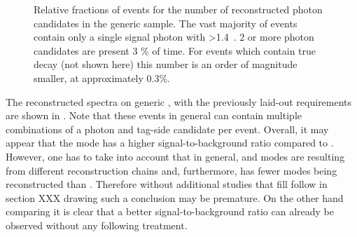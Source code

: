 \begin{figure}[htbp!]
    \centering
    \caption{\label{fig:photon_reco_candidates} Relative fractions of events for the number of reconstructed photon candidates in the generic \MC sample.
    The vast majority of events contain only a single signal photon with \EB>1.4~\gev.
    2 or more photon candidates are present 3 \% of time.
    For events which contain true \BtoXsgamma decay (not shown here) this number is an order of magnitude smaller, at approximately 0.3\%.
    }
\end{figure}

The reconstructed \BtoXsgamma spectra on generic \MC, with the previously laid-out requirements are shown in .
Note that these events in general can contain multiple combinations of a photon and tag-side candidate per event.
Overall, it may appear that the \FEI \Bz mode has a higher signal-to-background ratio compared to \FEI \Bp.
However, one has to take into account that in general, \FEI \Bp and \FEI \Bz modes are resulting from different reconstruction chains and, furthermore, \FEI \Bz has fewer modes being reconstructed than \FEI \Bp.
Therefore without additional studies that fill follow in section XXX drawing such a conclusion may be premature. 
On the other hand comparing  it is clear that a better signal-to-background ratio can already be observed without any following treatment.


